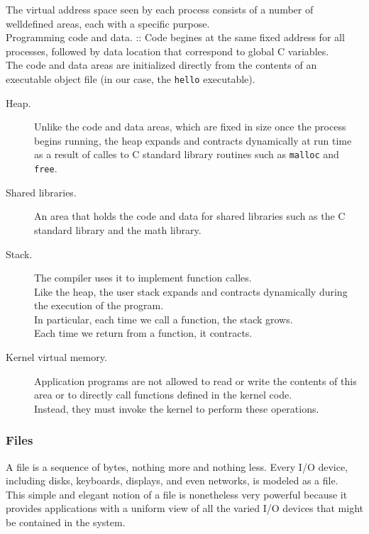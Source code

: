 \documentclass[11pt]{article}
\begin{document}
The virtual address space seen by each process consists of a number of welldefined areas, each with a specific purpose.\\
Programming code and data. :: Code begines at the same fixed address for all processes, followed by data location that correspond to global C variables.\\
     The code and data areas are initialized directly from the contents of an executable object file (in our case, the \texttt{hello} executable).\\
\begin{description}
\item[{Heap.}] Unlike the code and data areas, which are fixed in size once the process begins running, the heap expands and contracts dynamically at run time as a result of calles to C standard library routines such as \texttt{malloc} and \texttt{free}.\\
\item[{Shared libraries.}] An area that holds the code and data for shared libraries such as the C standard library and the math library.\\
\item[{Stack.}] The compiler uses it to implement function calles.\\
Like the heap, the user stack expands and contracts dynamically during the execution of the program.\\
In particular, each time we call a function, the stack grows.\\
Each time we return from a function, it contracts.\\
\item[{Kernel virtual memory.}] Application programs are not allowed to read or write the contents of this area or to directly call functions defined in the kernel code.\\
Instead, they must invoke the kernel to perform these operations.\\
\end{description}


\subsubsection{Files}
\label{sec:org5858615}
A file is a sequence of bytes, nothing more and nothing less. Every I/O device, including disks, keyboards, displays, and even networks, is modeled as a file.\\

This simple and elegant notion of a file is nonetheless very powerful because it provides applications with a uniform view of all the varied I/O devices that might be contained in the system.\\
\end{document}
